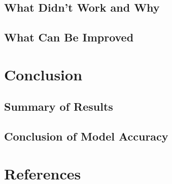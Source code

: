 \documentclass{article}
\begin{document}
\subsection{What Didn’t Work and Why}
\subsection{What Can Be Improved}

\section{Conclusion}
\subsection{Summary of Results}
\subsection{Conclusion of Model Accuracy}

\section{References}
\end{document}
